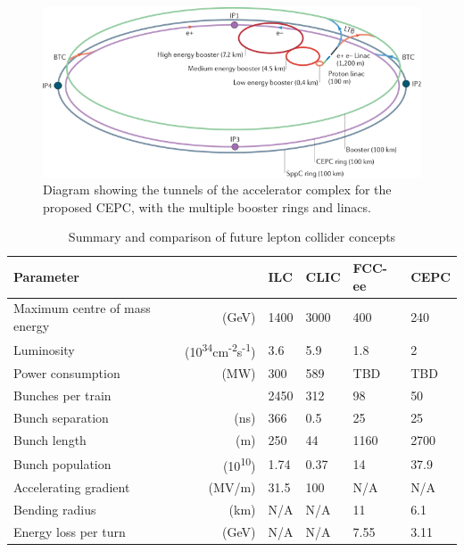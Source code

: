 \begin{figure}[h]
	\centering
	\includegraphics[width=1.0\textwidth]{../Pictures/CEPC-Scale.png}
	\caption{Diagram showing the tunnels of the accelerator complex for the proposed \acrlong{CEPC}, with the multiple booster rings and linacs.}
	\label{figure:colliders/CEPC/main}
\end{figure}

\begin{table}[b]
\centering
	\begin{tabular}{ l r l l l l }
	\hline \hline
	\textbf{Parameter} & & \textbf{ILC} & \textbf{CLIC} & \textbf{FCC-ee} & \textbf{CEPC} \\ \hline
	Maximum centre of mass energy & (GeV) & 1400 & 3000 & 400 & 240 \\
	Luminosity & (10\textsuperscript{34}cm\textsuperscript{-2}s\textsuperscript{-1}) & 3.6 & 5.9 & 1.8 & 2 \\
	Power consumption & (MW) & 300 & 589 & TBD & TBD \\
	Bunches per train & & 2450 & 312 & 98 & 50 \\
	Bunch separation & (ns) & 366 & 0.5 & 25 & 25 \\
	Bunch length & (\textmu m) & 250 & 44 & 1160 & 2700 \\
	Bunch population & (10\textsuperscript{10}) & 1.74 & 0.37 & 14 & 37.9 \\

	Accelerating gradient & (MV/m) & 31.5 & 100 & N/A & N/A \\
	Bending radius & (km) & N/A & N/A & 11 & 6.1 \\
	Energy loss per turn & (GeV) & N/A & N/A & 7.55 & 3.11  \\ \hline \hline


	\end{tabular}
	\caption{Summary and comparison of future lepton collider concepts}
	\label{table:colliders/parameters}
\end{table}

